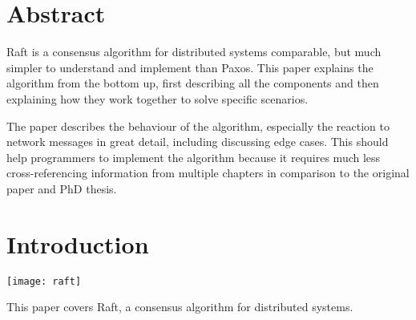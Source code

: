 




\begin{titlepage}
\afterpage{\restorepagecolor}
\newcommand{\colorRule}[3][black]{\textcolor[HTML]{#1}{\rule{#2}{#3}}}
\end{titlepage}
\restoregeometry



{
\hypersetup{linkcolor=}
\setcounter{tocdepth}{3}
\tableofcontents
\pagebreak
}

\section{Abstract}

Raft is a consensus algorithm for distributed systems comparable, but much simpler to understand and implement than Paxos.
This paper explains the algorithm from the bottom up, first describing all the components and
then explaining how they work together to solve specific scenarios.

The paper describes the behaviour of the algorithm, especially the reaction to network messages
in great detail, including discussing edge cases. This should help programmers to implement
the algorithm because it requires much less cross-referencing information from multiple chapters in
comparison to the original paper and PhD thesis.

\section{Introduction}

\texttt{[image: raft]}

This paper covers Raft, a consensus algorithm for distributed systems.

